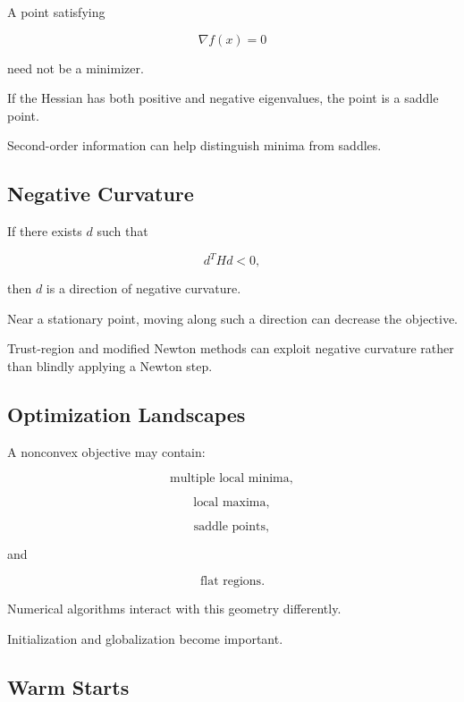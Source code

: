 A point satisfying

\[
\boxed{
\nabla f(x)=0
}
\]

need not be a minimizer.

If the Hessian has both positive and negative eigenvalues, the point is a
saddle point.

Second-order information can help distinguish minima from saddles.

\subsection{Negative Curvature}
\label{subsec:negative-curvature}

If there exists \(d\) such that

\[
\boxed{
d^THd<0,
}
\]

then \(d\) is a direction of negative curvature.

Near a stationary point, moving along such a direction can decrease the
objective.

Trust-region and modified Newton methods can exploit negative curvature
rather than blindly applying a Newton step.

\subsection{Optimization Landscapes}
\label{subsec:optimization-landscapes}

A nonconvex objective may contain:

\[
\boxed{
\text{multiple local minima},
}
\]

\[
\boxed{
\text{local maxima},
}
\]

\[
\boxed{
\text{saddle points},
}
\]

and

\[
\boxed{
\text{flat regions}.
}
\]

Numerical algorithms interact with this geometry differently.

Initialization and globalization become important.

\subsection{Warm Starts}
\label{subsec:optimization-warm-starts}

